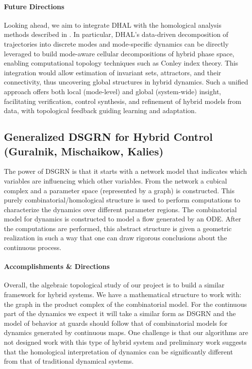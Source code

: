 \documentclass[letterpaper,11pt]{article}
\begin{document}
\paragraph{Future Directions}

Looking ahead, we aim to integrate DHAL with the homological analysis methods described in .
In particular, DHAL’s data-driven decomposition of trajectories into discrete modes and mode-specific dynamics can be directly leveraged to build mode-aware cellular decompositions of hybrid phase space, enabling computational topology techniques such as Conley index theory.
This integration would allow estimation of invariant sets, attractors, and their connectivity, thus uncovering global structures in hybrid dynamics.
Such a unified approach offers both local (mode-level) and global (system-wide) insight, facilitating verification, control synthesis, and refinement of hybrid models from data, with topological feedback guiding learning and adaptation.

\subsection{Generalized DSGRN for Hybrid Control (Guralnik, Mischaikow, Kalies)}\label{sec:DSGRN}

The power of DSGRN is that it starts with a network model that indicates which variables are influencing which other variables.
From the network a cubical complex and a parameter space (represented by a graph) is constructed.
This purely combinatorial/homological structure is used to perform computations to characterize the dynamics over different parameter regions.
The combinatorial model for dynamics is constructed to model a flow generated by an ODE.
After the computations are performed, this abstract structure is given a geometric realization in such a way that one can draw rigorous conclusions about the continuous process.

\paragraph{Accomplishments \& Directions}

Overall, the algebraic topological study of our project is to build a similar framework for hybrid systems.
We have a mathematical structure to work with: the graph in the product complex of the combinatorial model.
For the continuous part of the dynamics we expect it will take a similar form as DSGRN and 
the model of behavior at guards should follow that of combinatorial models for dynamics generated by continuous maps.
One challenge is that our algorithms are not designed work with this type of hybrid system and preliminary work suggests that the homological interpretation of dynamics can be significantly different from that of traditional dynamical systems.
\end{document}
